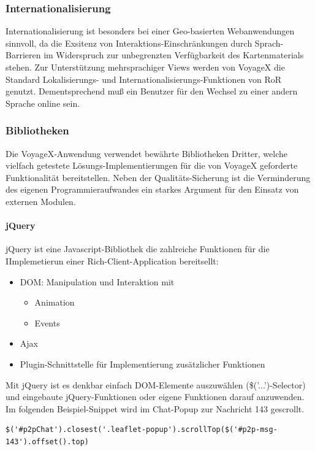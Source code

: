 \subsubsection{Internationalisierung}
Internationalisierung ist besonders bei einer Geo-basierten Webanwendungen sinnvoll, da die Exsitenz von Interaktions-Einschränkungen durch Sprach-Barrieren im Widerspruch zur unbegrenzten Verfügbarkeit des Kartenmaterials stehen. Zur Unterstützung mehrsprachiger Views werden von VoyageX die Standard Lokalisierungs- und Internationalisierungs-Funktionen von RoR genutzt. Dementsprechend muß ein Benutzer für
den Wechsel zu einer andern Sprache online sein.  

\subsubsection{Bibliotheken}
Die VoyageX-Anwendung verwendet bewährte Bibliotheken Dritter, welche vielfach getestete Lösungs-Implementierungen für die von VoyageX geforderte Funktionalität bereitstellen. Neben der Qualitäts-Sicherung ist die Verminderung des eigenen Programmieraufwandes ein starkes Argument für den Einsatz von externen
Modulen.

\paragraph{jQuery}
jQuery ist eine Javascript-Bibliothek die zahlreiche Funktionen für die IImplemetierun einer Rich-Client-Application bereitsellt:
	\begin{itemize}
		\item DOM: Manipulation und Interaktion mit
		\begin{itemize}
			\item Animation
			\item Events
		\end{itemize}
		\item Ajax
		\item Plugin-Schnittstelle für Implementierung zusätzlicher Funktionen
	\end{itemize}
Mit jQuery ist es denkbar einfach DOM-Elemente auszuwählen (\$('...')-Selector) und eingebaute jQuery-Funktionen oder eigene Funktionen darauf anzuwenden. Im folgenden Beispiel-Snippet wird im Chat-Popup zur Nachricht 143 gescrollt.
\lstset{language=JavaScript}
\begin{lstlisting}[frame=single,xleftmargin=0pt,numbers=none]
$('#p2pChat').closest('.leaflet-popup').scrollTop($('#p2p-msg-143').offset().top)
\end{lstlisting}


